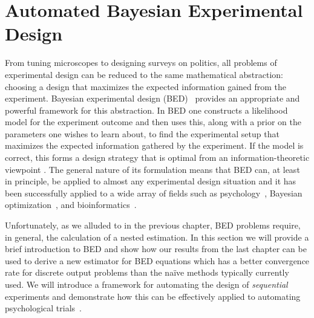 
\chapter{Automated Bayesian Experimental Design}
\label{chp:design}

From tuning microscopes to designing surveys on politics, all problems of 
experimental design can be reduced to the same mathematical abstraction:
choosing a design that maximizes the expected information gained from the 
experiment.
Bayesian experimental design (BED)~\citep{chaloner1995bayesian,sebastiani2000maximum} 
provides an appropriate and powerful framework for this abstraction.  In BED
one constructs a likelihood model for the experiment outcome and then uses this, along
with a prior on the parameters one wishes to learn about, to find the experimental setup
that maximizes the expected information gathered by the experiment.  
If the model is correct, this forms a design strategy that is optimal from
an information-theoretic viewpoint \citep{sebastiani2000maximum}.  
The general nature of its formulation means that BED can, at least in principle, be applied
to almost any experimental design situation and it has been successfully applied to a wide
array of fields such as psychology~\citep{myung2013tutorial,vincent2017darc,Cavagnaro:discounting},
Bayesian optimization~\citep{hennig2012entropy,hernandez2014predictive}, and
bioinformatics~\citep{vanlier2012bayesian}.

Unfortunately, as we alluded to in the previous chapter, BED problems require, in
general, the calculation of a nested estimation.
In this section we will provide a brief introduction to BED and show how our results
from the last chapter can be used to derive a new estimator for BED equations 
which has a better convergence rate for discrete output problems than the na\"{i}ve
methods typically currently used.  We will introduce a framework for automating the
design of \emph{sequential} experiments and demonstrate how this can be
effectively applied to automating psychological trials~\citep{vincent2017darc}.  




